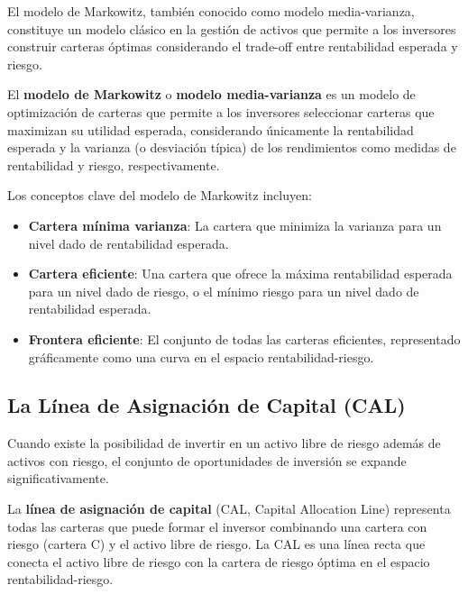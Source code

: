 El modelo de Markowitz, también conocido como modelo media-varianza, constituye un modelo clásico en la gestión de activos que permite a los inversores construir carteras óptimas considerando el trade-off entre rentabilidad esperada y riesgo.

\begin{definicion}
El \textbf{modelo de Markowitz} o \textbf{modelo media-varianza} es un modelo de optimización de carteras que permite a los inversores seleccionar carteras que maximizan su utilidad esperada, considerando únicamente la rentabilidad esperada y la varianza (o desviación típica) de los rendimientos como medidas de rentabilidad y riesgo, respectivamente.
\end{definicion}

Los conceptos clave del modelo de Markowitz incluyen:

\begin{itemize}
\item \textbf{Cartera mínima varianza}: La cartera que minimiza la varianza para un nivel dado de rentabilidad esperada.
\item \textbf{Cartera eficiente}: Una cartera que ofrece la máxima rentabilidad esperada para un nivel dado de riesgo, o el mínimo riesgo para un nivel dado de rentabilidad esperada.
\item \textbf{Frontera eficiente}: El conjunto de todas las carteras eficientes, representado gráficamente como una curva en el espacio rentabilidad-riesgo.
\end{itemize}

\subsection{La Línea de Asignación de Capital (CAL)}

Cuando existe la posibilidad de invertir en un activo libre de riesgo además de activos con riesgo, el conjunto de oportunidades de inversión se expande significativamente.

\begin{definicion}
La \textbf{línea de asignación de capital} (CAL, Capital Allocation Line) representa todas las carteras que puede formar el inversor combinando una cartera con riesgo (cartera C) y el activo libre de riesgo. La CAL es una línea recta que conecta el activo libre de riesgo con la cartera de riesgo óptima en el espacio rentabilidad-riesgo.
\end{definicion}

